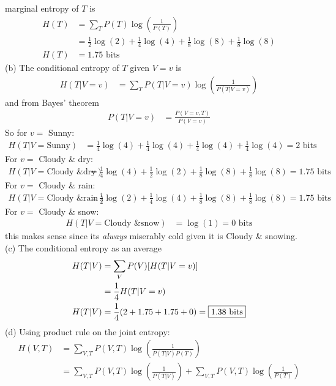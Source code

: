 \documentclass[../main.tex]{subfiles}
\begin{document}
marginal entropy of $T$ is
\begin{align*}
    H(T) &= \sum_T P(T) \log(\frac{1}{P(T)}) \\
    &= \frac{1}{2}\log(2) + \frac{1}{4}\log(4) + \frac{1}{8}\log(8) + \frac{1}{8}\log(8) \\
    H(T) &= \boxed{1.75 \text{ bits}}
\end{align*}
(b) The conditional entropy of $T$ given $V = v$ is
\begin{align*}
    H(T|V = v) &= \sum_T P(T|V = v) \log(\frac{1}{P(T|V = v)})
\end{align*}
and from Bayes' theorem
\begin{align*}
    P(T|V = v) &= \frac{P(V=v,T)}{P(V = v)}
\end{align*}
So for $v =$ Sunny:
\begin{align*}
    H(T|V = \text{Sunny}) &= \frac{1}{4}\log(4) + \frac{1}{4}\log(4) 
        + \frac{1}{4}\log(4) + \frac{1}{4}\log(4) = 
        \boxed{2 \text{ bits}}
\end{align*}
For $v =$ Cloudy \& dry: 
\begin{align*}
    H(T|V = \text{Cloudy \& dry}) &= \frac{1}{4} \log(4) + \frac{1}{2} \log(2) 
        + \frac{1}{8} \log(8) + \frac{1}{8} \log(8) = 
        \boxed{1.75 \text{ bits}}
\end{align*}
For $v =$ Cloudy \& rain:
\begin{align*}
    H(T|V = \text{Cloudy \& rain}) &= \frac{1}{2} \log(2) + \frac{1}{4} \log(4) 
        + \frac{1}{8} \log(8) + \frac{1}{8} \log(8) = 
        \boxed{1.75 \text{ bits}}
\end{align*}
For $v =$ Cloudy \& snow:
\begin{align*}
    H(T|V = \text{Cloudy \& snow}) &= \log(1) = \boxed{0 \text{ bits}} 
\end{align*}
this makes sense since its \emph{always} miserably cold given it is Cloudy \& snowing. \\
(c) The conditional entropy as an average
\begin{align*}
    H(T|V) &= \sum_V P(V) \qt[H(T|V = v)] \\
    &= \frac{1}{4} H(T|V = v) \\
    H(T|V) &= \frac{1}{4} (2 + 1.75 + 1.75 + 0) = 
    \boxed{1.38 \text{ bits}}
\end{align*}
(d) Using product rule on the joint entropy:
\begin{align*}
    H(V,T) &= \sum_{V,T} P(V,T) \log(\frac{1}{P(T|V) P(T)}) \\
    &= \sum_{V,T} P(V,T) \log(\frac{1}{P(T|V)}) + \sum_{V,T} P(V,T) \log(\frac{1}{P(T)})
\end{align*}
\end{document}
